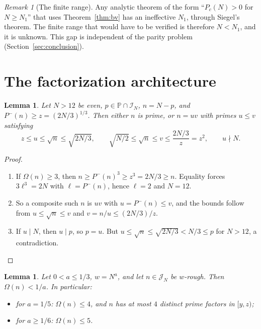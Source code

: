 \documentclass[final,11pt]{elsarticle}
\newtheorem{lemma}[theorem]{Lemma}
\theoremstyle{definition}
\theoremstyle{remark}
\newtheorem{remark}[theorem]{Remark}
\newcommand{\PP}{\mathbb{P}}
\newcommand{\Pm}{P^{-}}
\newcommand{\band}{\mathcal{I}_N}
\newcommand{\cband}{\mathcal{J}_N}
\numberwithin{equation}{section}
\begin{document}
\begin{remark}[The finite range]
Any analytic theorem of the form ``$P_c(N)>0$ for $N\ge N_1$'' that uses Theorem~\ref{thm:bv} has an ineffective $N_1$, through Siegel's theorem. The finite range that would have to be verified is therefore $N<N_1$, and it is unknown. This gap is independent of the parity problem (Section~\ref{sec:conclusion}).
\end{remark}



\section{The factorization architecture}\label{sec:block2}

\begin{lemma}\label{lem:geometry}
Let $N>12$ be even, $p\in\PP\cap\band$, $n=N-p$, and $\Pm(n)\ge z=(2N/3)^{1/3}$. Then either $n$ is prime, or $n=uv$ with primes $u\le v$ satisfying
\[
z\le u\le\sqrt{n}\le\sqrt{2N/3},\qquad \sqrt{N/2}\le\sqrt n\le v\le \frac{2N/3}{z}=z^2,\qquad u\nmid N .
\]
\end{lemma}

\begin{proof}
\begin{enumerate}
\item If $\Omega(n)\ge3$, then $n\ge\Pm(n)^3\ge z^3=2N/3\ge n$. Equality forces $3\ell^3=2N$ with $\ell=\Pm(n)$, hence $\ell=2$ and $N=12$.
\item So a composite such $n$ is $uv$ with $u=\Pm(n)\le v$, and the bounds follow from $u\le\sqrt n\le v$ and $v=n/u\le(2N/3)/z$.
\item If $u\mid N$, then $u\mid p$, so $p=u$. But
$u\le\sqrt n\le\sqrt{2N/3}<N/3\le p$ for $N>12$, a contradiction. \qedhere
\end{enumerate}
\end{proof}

\begin{lemma}\label{lem:omega-bound}
Let $0<a\le1/3$, $w=N^a$, and let $n\in\cband$ be $w$-rough. Then $\Omega(n)<1/a$. In particular:
\begin{itemize}
\item for $a=1/5$: $\Omega(n)\le4$, and $n$ has at most $4$ distinct prime factors in $[y,z)$;
\item for $a\ge1/6$: $\Omega(n)\le5$.
\end{itemize}
\end{lemma}
\end{document}
